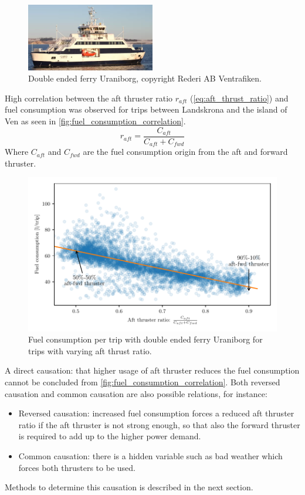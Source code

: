 \documentclass[fleqn,10pt]{olplainarticle}
\begin{document}
\begin{figure}[!htb]
    \centering
    \includegraphics[width=0.5\textwidth]{figures/uraniborg.png}
    \caption{Double ended ferry Uraniborg, copyright Rederi AB Ventrafiken.}
    \label{fig:uraniborg}
\end{figure}



High correlation between the aft thruster ratio $r_{aft}$ (\autoref{eq:aft_thrust_ratio}) and fuel consumption 
was observed for trips between Landskrona and the island of Ven as seen in \autoref{fig:fuel_consumption_correlation}.
\begin{equation}
    r_{aft} = \frac{C_{aft}}{C_{aft} + C_{fwd}}
    \label{eq:aft_thrust_ratio}
\end{equation}
Where $C_{aft}$ and $C_{fwd}$ are the fuel consumption origin from the aft and forward thruster.
\begin{figure}[!htb]
    \centering
    \includegraphics[width=\textwidth]{figures/correlation.pdf}
    \caption{Fuel consumption per trip with double ended ferry Uraniborg for trips with varying aft thrust ratio.}
    \label{fig:fuel_consumption_correlation}
\end{figure}

\noindent A direct causation: that higher usage of aft thruster reduces the fuel consumption cannot be concluded from \autoref{fig:fuel_consumption_correlation}. Both reversed causation and common causation are also possible relations, for instance:
\begin{itemize}
    \item Reversed causation: increased fuel consumption forces a reduced aft thruster ratio if the aft thruster is not strong enough, so that also the forward thruster is required to add up to the higher power demand.
    
    \item Common causation: there is a hidden variable such as bad weather which forces both thrusters to be used.
\end{itemize}
Methods to determine this causation is described in the next section. 
\end{document}
